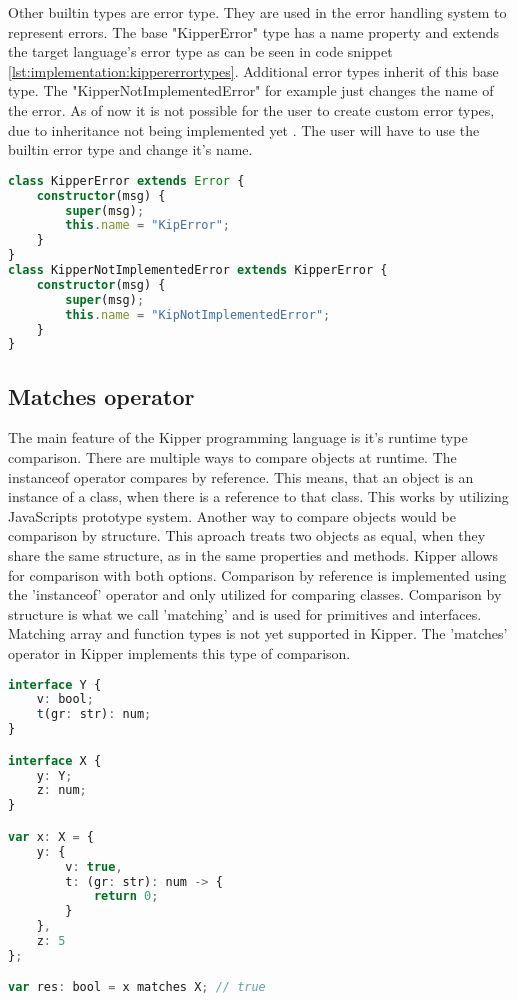 Other builtin types are error type. They are used in the error handling system to represent errors. The base "KipperError" type has a name property and extends the target language's error type as can be seen in code snippet \ref{lst:implementation:kippererrortypes}. Additional error types inherit of this base type. The "KipperNotImplementedError" for example just changes the name of the error. As of now it is not possible for the user to create custom error types, due to inheritance not being implemented yet . The user will have to use the builtin error type and change it's name.

\begin{lstlisting}[language=Typescript,caption=Kipper error types,label=lst:implementation:kippererrortypes]
class KipperError extends Error {
	constructor(msg) {
		super(msg);
		this.name = "KipError";
	}
}
class KipperNotImplementedError extends KipperError {
	constructor(msg) {
		super(msg);
		this.name = "KipNotImplementedError";
	}
}
\end{lstlisting}

\subsection{Matches operator}
\label{subsec:matches}

The main feature of the Kipper programming language is it's runtime type comparison. There are multiple ways to compare objects at runtime. The instanceof operator compares by reference. This means, that an object is an instance of a class, when there is a reference to that class. This works by utilizing JavaScripts prototype system. Another way to compare objects would be comparison by structure. This aproach treats two objects as equal, when they share the same structure, as in the same properties and methods. Kipper allows for comparison with both options. Comparison by reference is implemented using the 'instanceof' operator and only utilized for comparing classes. Comparison by structure is what we call 'matching' and is used for primitives and interfaces. Matching array and function types is not yet supported in Kipper. The 'matches' operator in Kipper implements this type of comparison.

\begin{lstlisting}[language=Typescript,caption=The Kipper matches operator,label=lst:implementation:matchesoperator]
interface Y {
	v: bool;
	t(gr: str): num;
}

interface X {
	y: Y;
	z: num;
}

var x: X = {
	y: {
		v: true,
		t: (gr: str): num -> {
			return 0;
		}
	},
	z: 5
};

var res: bool = x matches X; // true
\end{lstlisting}

